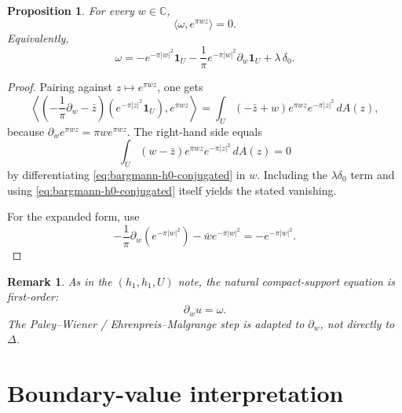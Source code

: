 \documentclass[11pt]{article}
\newtheorem{proposition}[theorem]{Proposition}
\newtheorem{remark}[theorem]{Remark}
\newcommand{\C}{\mathbb C}
\newcommand{\1}{\mathbf 1}
\newcommand{\pw}{\partial_w}
\begin{document}
\begin{proposition}\label{prop:first-order}
For every \(w\in \C\),
\[
\langle \omega,e^{\pi wz}\rangle=0.
\]
Equivalently,
\begin{equation}\label{eq:omega-expanded}
\omega
=
-e^{-\pi|w|^2}\1_U
-\frac1\pi e^{-\pi|w|^2}\pw \1_U
+\lambda\,\delta_0.
\end{equation}
\end{proposition}

\begin{proof}
Pairing against \(z\mapsto e^{\pi wz}\), one gets
\[
\left\langle
\left(-\frac{1}{\pi}\pw-\bar z\right)\!\left(e^{-\pi|z|^2}\1_U\right),
e^{\pi wz}
\right\rangle
=
\int_U ( -\bar z+w)e^{\pi wz}e^{-\pi|z|^2}\,dA(z),
\]
because \(\pw e^{\pi wz}=\pi w e^{\pi wz}\). The right-hand side equals
\[
\int_U (w-\bar z)e^{\pi wz}e^{-\pi|z|^2}\,dA(z)=0
\]
by differentiating \eqref{eq:bargmann-h0-conjugated} in \(w\). Including the \(\lambda\delta_0\)
term and using \eqref{eq:bargmann-h0-conjugated} itself yields the stated vanishing.

For the expanded form, use
\[
-\frac1\pi\pw(e^{-\pi|w|^2})-\bar w e^{-\pi|w|^2}
=
-e^{-\pi|w|^2}.
\]
\end{proof}

\begin{remark}
As in the \((h_1,h_1,U)\) note, the natural compact-support equation is first-order:
\begin{equation}\label{eq:first-order-u}
\pw u=\omega.
\end{equation}
The Paley--Wiener / Ehrenpreis--Malgrange step is adapted to \(\pw\), not directly to
\(\Delta\).
\end{remark}

\section{Boundary-value interpretation}
\end{document}
